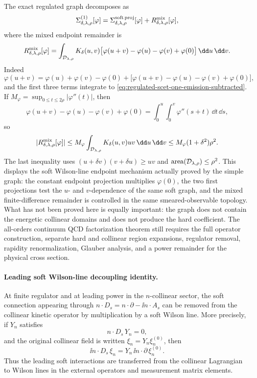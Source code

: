 The exact regulated graph decomposes as
\begin{equation}
  \Sigma_{\delta,\lambda,\rho}^{(1)}[\varphi]
  =
  \Sigma_{\delta,\lambda,\rho}^{\rm soft\,proj}[\varphi]
  +
  R_{\delta,\lambda,\rho}^{\rm mix}[\varphi],
  \label{eq:regulated-scet-one-emission-decomposition}
\end{equation}
where the mixed endpoint remainder is
\begin{equation}
  R_{\delta,\lambda,\rho}^{\rm mix}[\varphi]
  =
  \int_{\mathcal D_{\lambda,\rho}}
  K_\delta(u,v)
  \bigl[\varphi(u+v)-\varphi(u)-\varphi(v)+\varphi(0)\bigr]
  \,\dd u\,\dd v .
  \label{eq:regulated-scet-one-emission-remainder}
\end{equation}
Indeed
\[
  \varphi(u+v)
  =
  \varphi(u)+\varphi(v)-\varphi(0)
  +
  \bigl[\varphi(u+v)-\varphi(u)-\varphi(v)+\varphi(0)\bigr],
\]
and the first three terms integrate to
\eqref{eq:regulated-scet-one-emission-subtracted}.  If
\(M_\varphi=\sup_{0\le t\le2\rho}|\varphi''(t)|\), then
\[
  \varphi(u+v)-\varphi(u)-\varphi(v)+\varphi(0)
  =
  \int_0^u\!\!\int_0^v \varphi''(s+t)\,\dd t\,\dd s,
\]
so
\begin{equation}
  |R_{\delta,\lambda,\rho}^{\rm mix}[\varphi]|
  \le
  M_\varphi
  \int_{\mathcal D_{\lambda,\rho}}K_\delta(u,v)uv\,\dd u\,\dd v
  \le
  M_\varphi(1+\delta^2)\rho^2 .
  \label{eq:regulated-scet-one-emission-remainder-bound}
\end{equation}
The last inequality uses
\((u+\delta v)(v+\delta u)\ge uv\) and
\({\rm area}(\mathcal D_{\lambda,\rho})\le\rho^2\).  This displays the
soft Wilson-line endpoint mechanism actually proved by the simple graph: the
constant endpoint projection multiplies \(\varphi(0)\), the two first
projections test the \(u\)- and \(v\)-dependence of the same soft graph, and
the mixed finite-difference remainder is controlled in the same
smeared-observable topology.  What has not been proved here is equally
important: the graph does not contain the energetic collinear domains and does
not produce the hard coefficient.  The all-orders continuum QCD factorization
theorem still requires the full operator construction, separate hard and
collinear region expansions, regulator removal, rapidity renormalization,
Glauber analysis, and a power remainder for the physical cross section.

\paragraph{Leading soft Wilson-line decoupling identity.}
At finite regulator and at leading power in the \(n\)-collinear sector, the
soft connection appearing through \(n\cdot D_s=n\cdot\partial-\ii n\cdot A_s\)
can be removed from the collinear kinetic operator by multiplication by a soft
Wilson line.  More precisely, if \(Y_n\) satisfies
\[
  n\cdot D_s\,Y_n=0,
\]
and the original collinear field is written \(\xi_n=Y_n\xi_n^{(0)}\), then
\[
  \ii n\cdot D_s\,\xi_n
  =
  Y_n\,\ii n\cdot\partial\,\xi_n^{(0)} .
\]
Thus the leading soft interactions are transferred from the collinear
Lagrangian to Wilson lines in the external operators and measurement matrix
elements.

